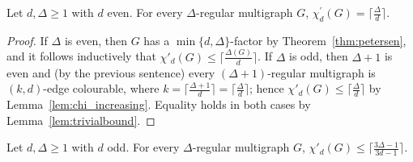\begin{theorem}
Let $d, \Delta \geq 1$ with $d$ even. For every $\Delta$-regular multigraph $G$, $\chi^{'}_{d}(G) = \lceil \frac{\Delta}{d} \rceil$.
\end{theorem}

\begin{proof}
If $\Delta$ is even, then $G$ has a $\min\{d,\Delta\}$-factor by Theorem~\ref{thm:petersen}, and it follows inductively that $\chi'_d(G) \leq \lceil \frac{\Delta(G)}{d} \rceil$.  
If $\Delta$ is odd, then $\Delta+1$ is even and (by the previous sentence) every $(\Delta+1)$-regular multigraph is $(k,d)$-edge colourable, where $k = \lceil \frac{\Delta+1}{d} \rceil = \lceil \frac{\Delta}{d} \rceil$; hence $\chi'_d(G) \leq \lceil \frac{\Delta}{d} \rceil$ by Lemma~\ref{lem:chi_increasing}. Equality holds in both cases by Lemma~\ref{lem:trivialbound}.
\end{proof}

\begin{theorem}
Let $d, \Delta \geq 1$ with $d$ odd. 
For every $\Delta$-regular multigraph $G$, $\chi'_d(G) \leq \lceil \frac{3\Delta - 1}{3d - 1} \rceil$. 
\end{theorem}

